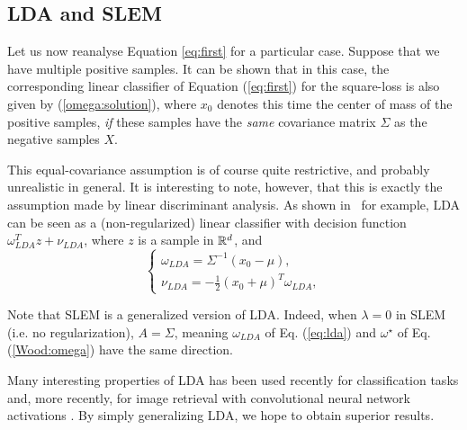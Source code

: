 \subsection{LDA and SLEM}\label{sec:lda}

Let us now reanalyse Equation \ref{eq:first} for a particular case. Suppose that we have multiple positive samples. It can be shown that in this case, the corresponding linear classifier of Equation (\ref{eq:first}) for the square-loss is also given by
(\ref{omega:solution}), where $x_0$ denotes this time the center of mass
of the positive samples, {\em if} these samples have the {\em same} covariance matrix $\Sigma$ as the negative samples $X$.
 
This equal-covariance assumption is of course quite restrictive, and probably unrealistic in general. It is interesting to note, however, that this is exactly the assumption made by linear discriminant analysis. As shown in~\cite{Hastie2009} for example, LDA can be seen as a (non-regularized) linear classifier with decision function $\omega^T_{LDA} z+ \nu_{LDA}$, where $z$ is a sample in
$\mathbb R^d$, and
\begin{equation}
\left\{\begin{array}{l}
\displaystyle \omega_{LDA}=\Sigma^{-1}(x_0-\mu),\\
\displaystyle \nu_{LDA}=-\frac{1}{2}(x_0+\mu)^T \omega_{LDA},
\end{array}\right.
\label{eq:lda}
\end{equation}
 
Note that SLEM is a generalized version of LDA. Indeed, when $\lambda=0$ in SLEM (i.e. no regularization), $A = \Sigma$, meaning $\omega_{LDA}$ of Eq. (\ref{eq:lda}) and $\omega^\star$ of Eq. (\ref{Wood:omega}) have the same direction.

Many interesting properties of LDA has been used recently for classification tasks \cite{GMPD12,HMR12} and, more recently, for image retrieval with convolutional neural network activations \cite{babenko15}.
By simply generalizing LDA, we hope to obtain superior results.



